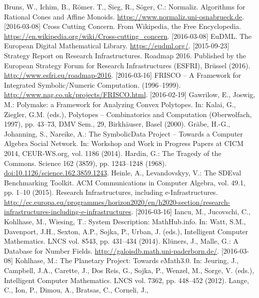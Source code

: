 \documentclass{llncs}
\newcommand{\SD}{{\sc Symbo\-lic\-Data}}
\begin{document}
\raggedright
\begin{thebibliography}{xxx}
 Bruns, W., Ichim, B., R\"omer. T., Sieg, R., S\"oger, C.:
  Normaliz. Algorithms for Rational Cones and Affine Monoids.
  \url{https://www.normaliz.uni-osnabrueck.de}. [2016-03-08]
 Cross Cutting Concern. From Wikipedia, the Free Encyclopedia.
  \url{https://en.wikipedia.org/wiki/Cross-cutting_concern}. [2016-03-08]
 EuDML. The European Digital Mathematical Library.
  \url{https://eudml.org/}. [2015-09-23]
 Strategy Report on Research Infrastructures.  Roadmap 2016.
  Published by the European Strategy Forum for Research Infrastructures
  (ESFRI), Br\"ussel (2016).  \url{http://www.esfri.eu/roadmap-2016}.
  [2016-03-16]
 FRISCO -- A Framework for Integrated Symbolic/Numeric
  Computation. (1996--1999).  \url{http://www.nag.co.uk/projects/FRISCO.html}.
  [2016-02-19]
 Gawrilow, E., Joswig, M.: Polymake: a Framework for
  Analyzing Convex Polytopes. In: Kalai, G., Ziegler, G.M. (eds.), Polytopes --
  Combinatorics and Computation (Oberwolfach, 1997), pp. 43--73, DMV Sem., 29,
  Birkh\"auser, Basel (2000). 
 Gr\"abe, H.-G., Johanning, S., Nareike, A.: The {\SD} Project
  -- Towards a Computer Algebra Social Network. In: Workshop and Work in
  Progress Papers at CICM 2014, CEUR-WS.org, vol. 1186 (2014).
 Hardin, G.: The Tragedy of the Commons. Science 162 (3859),
  pp. 1243--1248 (1968). \url{doi:10.1126/science.162.3859.1243}. 
 Heinle, A., Levandovskyy, V.: The SDEval Benchmarking
  Toolkit. ACM Communications in Computer Algebra, vol. 49.1, pp. 1--10 (2015).
 Research Infrastructures, including e-Infrastructures.
  \url{http://ec.europa.eu/programmes/horizon2020/en/h2020-section/research-infrastructures-including-e-infrastructures}. [2016-03-16]
 Iancu, M., Jucovschi, C., Kohlhase, M., Wiesing, T.: System
  Description: MathHub.info. In: Watt, S.M., Davenport, J.H., Sexton, A.P.,
  Sojka, P., Urban, J. (eds.), Intelligent Computer Mathematics. LNCS vol.
  8543, pp. 431--434 (2014).
 Kl\"uners, J., Malle, G.: A Database for Number Fields.
  \url{http://galoisdb.math.uni-paderborn.de/}. [2016-03-08]
 Kohlhase, M.: The Planetary Project: Towards eMath3.0. In:
  Jeuring, J., Campbell, J.A., Carette, J., Dos Reis, G., Sojka, P., Wenzel,
  M., Sorge, V. (eds.), Intelligent Computer Mathematics.  LNCS vol. 7362,
  pp. 448--452 (2012).
 Lange, C., Ion, P., Dimou, A., Bratsas, C., Corneli, J.,

\end{thebibliography}
\end{document}
